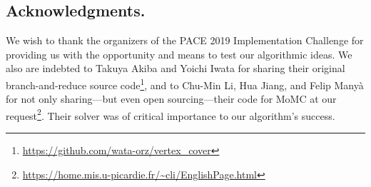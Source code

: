 \documentclass[twoside,leqno,twocolumn]{article}
\begin{document}
\subsection*{Acknowledgments.}
We wish to thank the organizers of the PACE 2019 Implementation Challenge for providing us with the opportunity and means to test our algorithmic ideas. We also are indebted to Takuya Akiba and  Yoichi Iwata for sharing their original branch-and-reduce source code\footnote{\url{https://github.com/wata-orz/vertex_cover}}, and to Chu-Min Li, Hua Jiang, and Felip Many\`a for not only sharing---but even open sourcing---their code for MoMC at our request\footnote{\url{https://home.mis.u-picardie.fr/~cli/EnglishPage.html}}. Their solver was of critical importance to our algorithm's success.

\vfill
\end{document}

